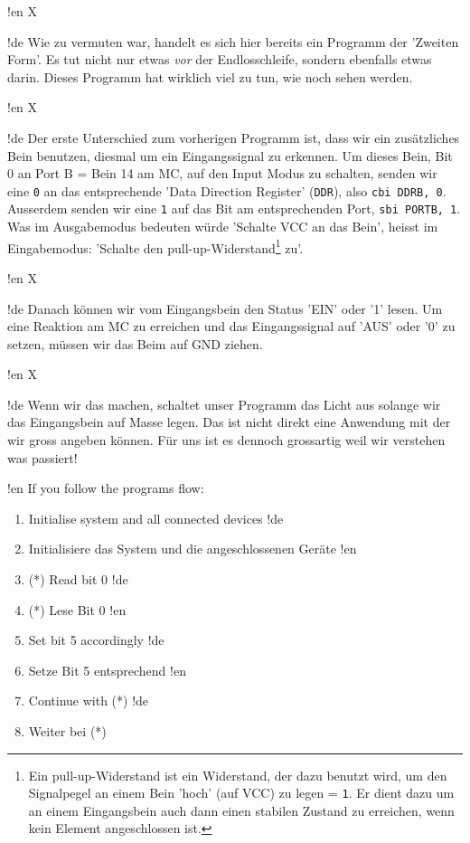 !en X

!de Wie zu vermuten war, handelt es sich hier bereits ein Programm der 'Zweiten Form'. Es tut nicht nur etwas \textit{vor} der Endlosschleife, sondern ebenfalls etwas darin. Dieses Programm hat wirklich viel zu tun, wie noch sehen werden.



!en X

!de Der erste Unterschied zum vorherigen Programm ist, dass wir ein zusätzliches Bein benutzen, diesmal um ein Eingangssignal zu erkennen. Um dieses Bein, Bit 0 an Port B = Bein 14 am MC, auf den Input Modus zu schalten, senden wir eine \texttt{0} an das entsprechende 'Data Direction Register' (\texttt{DDR}), also \texttt{cbi DDRB, 0}. Ausserdem senden wir eine \texttt{1} auf das Bit am entsprechenden Port, \texttt{sbi PORTB, 1}. Was im Ausgabemodus bedeuten würde 'Schalte VCC an das Bein', heisst im Eingabemodus: 'Schalte den pull-up-Widerstand\footnote{Ein pull-up-Widerstand ist ein Widerstand, der dazu benutzt wird, um den Signalpegel an einem Bein 'hoch' (auf VCC) zu legen = \texttt{1}. Er dient dazu um an einem Eingangsbein auch dann einen stabilen Zustand zu erreichen, wenn kein Element angeschlossen ist.} zu'.



!en X

!de Danach können wir vom Eingangsbein den Status 'EIN' oder '1' lesen. Um eine Reaktion am MC zu erreichen und das Eingangssignal auf 'AUS' oder '0' zu setzen, müssen wir das Beim auf GND ziehen.



!en X

!de Wenn wir das machen, schaltet unser Programm das Licht aus solange wir das Eingangsbein auf Masse legen. Das ist nicht direkt eine Anwendung mit der wir gross angeben können. Für uns ist es dennoch grossartig weil wir verstehen was passiert!



!en If you follow the programs flow:


\begin{enumerate}
!en   \item Initialise system and all connected devices
!de   \item Initialisiere das System und die angeschlossenen Geräte
!en   \item (*) Read bit 0
!de   \item (*) Lese Bit 0
!en   \item Set bit 5 accordingly
!de   \item Setze Bit 5 entsprechend
!en   \item Continue with (*)
!de   \item Weiter bei (*)
\end{enumerate}



